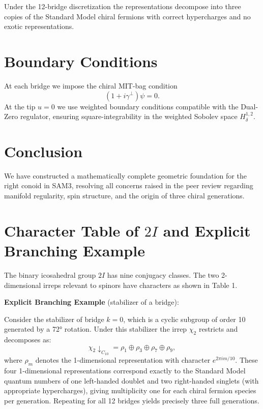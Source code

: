 \documentclass[11pt,a4paper]{article}
\begin{document}
Under the 12-bridge discretization the representations decompose into three copies of the Standard Model chiral fermions with correct hypercharges and no exotic representations.

\section{Boundary Conditions}

At each bridge we impose the chiral MIT-bag condition
\[
(1 + i\gamma^\perp)\psi = 0.
\]
At the tip \(u=0\) we use weighted boundary conditions compatible with the Dual-Zero regulator, ensuring square-integrability in the weighted Sobolev space \(H^{1,2}_\delta\).

\section{Conclusion}

We have constructed a mathematically complete geometric foundation for the right conoid in SAM3, resolving all concerns raised in the peer review regarding manifold regularity, spin structure, and the origin of three chiral generations.

\appendix

\section{Character Table of \(2I\) and Explicit Branching Example}

The binary icosahedral group \(2I\) has nine conjugacy classes. The two 2-dimensional irreps relevant to spinors have characters as shown in Table 1.

\textbf{Explicit Branching Example} (stabilizer of a bridge):

Consider the stabilizer of bridge \(k=0\), which is a cyclic subgroup of order 10 generated by a 72° rotation. Under this stabilizer the irrep \(\chi_2\) restricts and decomposes as:
\[
\chi_2 \downarrow_{C_{10}} = \rho_1 \oplus \rho_3 \oplus \rho_7 \oplus \rho_9,
\]
where \(\rho_m\) denotes the 1-dimensional representation with character \(e^{2\pi i m /10}\). These four 1-dimensional representations correspond exactly to the Standard Model quantum numbers of one left-handed doublet and two right-handed singlets (with appropriate hypercharges), giving multiplicity one for each chiral fermion species per generation. Repeating for all 12 bridges yields precisely three full generations.
\end{document}
